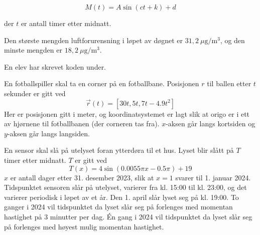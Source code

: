 \begin{equation*}
	M(t) = A \sin(ct + k) + d
\end{equation*}

der $t$ er antall timer etter midnatt. \os

Den største mengden luftforurensning i løpet av døgnet er $31{,}2\ \mu\text{g}/\text{m}^3$,
og den minste mengden er $18{,}2\ \mu\text{g}/\text{m}^3$.


En elev har skrevet koden under.

En fotballspiller skal ta en corner på en fotballbane. Posisjonen $r$
til ballen etter $t$ sekunder er gitt ved
\[ \vec{r}(t) = [30t, 5t, 7t - 4.9t^2] \]
Her er posisjonen gitt i meter, og koordinatsystemet er lagt slik at origo er i
ett av hjørnene til fotballbanen (der corneren tas fra). $x$-aksen går langs kortsiden og $y$-aksen går langs
langsiden.

En sensor skal slå på utelyset foran ytterdøra til et hus. Lyset blir slått på $T$
timer etter midnatt. $T$ er gitt ved
\[ T(x) = 4 \sin(0.0055\pi x - 0.5\pi) + 19 \]
$x$ er antall dager etter 31. desember 2023, slik at $x=1$ svarer til 1. januar 2024.
Tidspunktet sensoren slår på utelyset, varierer fra kl. 15:00 til kl. 23:00, og det
varierer periodisk i løpet av et år. Den 1. april slår lyset seg på kl. 19:00.
To ganger i 2024 vil tidspunktet da lyset slår seg på forlenges med momentan hastighet på 3 minutter per dag.
Én gang i 2024 vil tidspunktet da lyset slår seg på forlenges med høyest mulig momentan hastighet.

